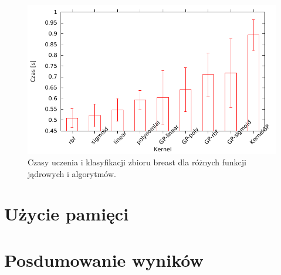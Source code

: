 \begin{figure}
	\includegraphics[scale=0.60]{figures/results/time/time_almost_all_breast}
	\caption{Czasy uczenia i klasyfikacji zbioru breast dla różnych funkcji jądrowych i algorytmów. \label{fig:time-all-breast}}
\end{figure} 



\section{Użycie pamięci}

\section{Posdumowanie wyników}

\clearpage
